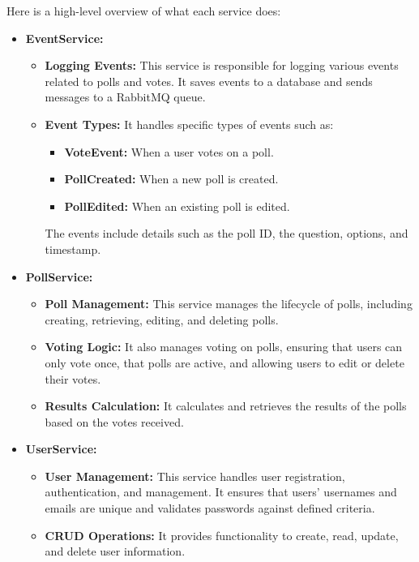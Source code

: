 Here is a high-level overview of what each service does:
\begin{itemize}
    \item \textbf{EventService:}
    \begin{itemize}
        \item \textbf{Logging Events:} This service is responsible for logging various events related to polls and votes. It saves events to a database and sends messages to a RabbitMQ queue.
        \item \textbf{Event Types:} It handles specific types of events such as:
        \begin{itemize}	
            \item \textbf{VoteEvent:} When a user votes on a poll.
            \item \textbf{PollCreated:} When a new poll is created.
            \item \textbf{PollEdited:} When an existing poll is edited.
        \end{itemize}
        The events include details such as the poll ID, the question, options, and timestamp.
    \end{itemize}

    \item \textbf{PollService:}
    \begin{itemize}
        \item \textbf{Poll Management:} This service manages the lifecycle of polls, including creating, retrieving, editing, and deleting polls.
        \item \textbf{Voting Logic:} It also manages voting on polls, ensuring that users can only vote once, that polls are active, and allowing users to edit or delete their votes.
        \item \textbf{Results Calculation:} It calculates and retrieves the results of the polls based on the votes received.
    \end{itemize}

    \item \textbf{UserService:}
    \begin{itemize}
        \item \textbf{User Management:} This service handles user registration, authentication, and management. It ensures that users' usernames and emails are unique and validates passwords against defined criteria.
        \item \textbf{CRUD Operations:} It provides functionality to create, read, update, and delete user information.
    \end{itemize}


\end{itemize}

